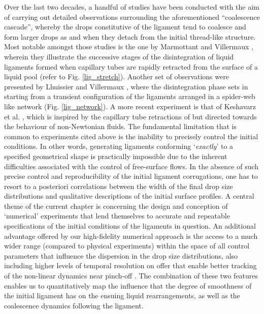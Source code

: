 Over the last two decades, a handful of studies have been conducted 
with the aim of carrying out detailed observations surrounding 
the aforementioned ``coalescence cascade'', whereby the drops 
constitutive of the ligament tend to coalesce and form larger drops
as and when they detach from the initial thread-like structure.
Most notable amongst those studies is the one by Marmottant and Villermaux \cite{vill_3},
wherein they illustrate the successive stages of the disintegration of 
liquid ligaments formed when capillary tubes are rapidly retracted from 
the surface of a liquid pool (refer to Fig. \ref{lig_stretch}). 
Another set of observations were presented by Lhuissier and Villermaux \cite{sheet_hole},
where the disintegration phase sets in starting from a transient configuration
of the ligaments arranged in a spider-web like network (Fig. \ref{lig_network}).  
A more recent experiment is that of Keshavarz et al. \cite{mckinley},
which is inspired by the capillary tube retractions of \cite{vill_3} 
but directed towards the behaviour of non-Newtonian fluids.
The fundamental limitation that is common to experiments cited above 
is the inability to precisely control the initial conditions.
In other words, generating ligaments conforming `\textit{exactly}'
to a specified geometrical shape is practically impossible 
due to the inherent difficulties associated with the control of free-surface flows.  
In the absence of such precise control and reproducibility of the initial 
ligament corrugations, one has to resort to a posteriori correlations between 
the width of the final drop size distributions and qualitative descriptions 
of the initial surface profiles.
A central theme of the current chapter is concerning the design and conception
of `numerical' experiments that lend themselves to accurate and repeatable 
specifications of the initial conditions of the ligaments in question.  
An additional advantage offered by our high-fidelity numerical approach 
is the access to a much wider range (compared to physical experiments) within the 
space of all control parameters that influence the dispersion in the drop size distributions, 
also including higher levels of temporal resolution on offer 
that enable better tracking of the non-linear dynamics near pinch-off
. 
The combination of these two features enables us to quantitatively map the 
influence that the degree of smoothness of the initial ligament has on the ensuing 
liquid rearrangements, as well as the coalescence dynamics following the ligament. 

